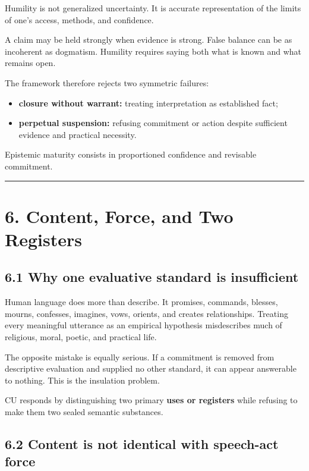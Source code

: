 \documentclass[
  11pt,
]{article}
\providecommand{\tightlist}{%
  \setlength{\itemsep}{0pt}\setlength{\parskip}{0pt}}
\begin{document}
Humility is not generalized uncertainty. It is accurate representation
of the limits of one's access, methods, and confidence.

A claim may be held strongly when evidence is strong. False balance can
be as incoherent as dogmatism. Humility requires saying both what is
known and what remains open.

The framework therefore rejects two symmetric failures:

\begin{itemize}
\tightlist
\item
  \textbf{closure without warrant:} treating interpretation as
  established fact;
\item
  \textbf{perpetual suspension:} refusing commitment or action despite
  sufficient evidence and practical necessity.
\end{itemize}

Epistemic maturity consists in proportioned confidence and revisable
commitment.

\begin{center}\rule{0.5\linewidth}{0.5pt}\end{center}

\section{6. Content, Force, and Two
Registers}\label{content-force-and-two-registers}

\subsection{6.1 Why one evaluative standard is
insufficient}\label{why-one-evaluative-standard-is-insufficient}

Human language does more than describe. It promises, commands, blesses,
mourns, confesses, imagines, vows, orients, and creates relationships.
Treating every meaningful utterance as an empirical hypothesis
misdescribes much of religious, moral, poetic, and practical life.

The opposite mistake is equally serious. If a commitment is removed from
descriptive evaluation and supplied no other standard, it can appear
answerable to nothing. This is the insulation problem.

CU responds by distinguishing two primary \textbf{uses or registers}
while refusing to make them two sealed semantic substances.

\subsection{6.2 Content is not identical with speech-act
force}\label{content-is-not-identical-with-speech-act-force}
\end{document}
